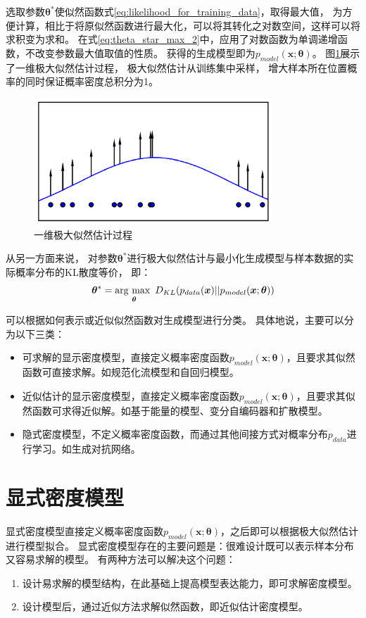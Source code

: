 选取参数{$\bm{\theta}^*$}使似然函数式{\ref{eq:likelihood_for_training_data}}，取得最大值，
为方便计算，相比于将原似然函数进行最大化，可以将其转化之对数空间，这样可以将求积变为求和。
在式{\ref{eq:theta_star_max_2}}中，应用了对数函数为单调递增函数，不改变参数最大值取值的性质。
获得的生成模型即为{$p_{model}(\bm{x};\bm{\theta})$}。
图{\ref{fig:max_likelihood}}展示了一维极大似然估计过程，
极大似然估计从训练集中采样，
增大样本所在位置概率的同时保证概率密度总积分为1。

\begin{figure}[ht]
    \centering
    \includegraphics[width=0.8\textwidth]{figures/max_likelihood}
    \caption{一维极大似然估计过程}\label{fig:max_likelihood}
\end{figure}

从另一方面来说，
对参数{$\bm{\theta}^*$}进行极大似然估计与最小化生成模型与样本数据的实际概率分布的KL散度等价，
即：
\begin{equation}
    \label{eq:kl_divergence_max_theta}
    \bm{\theta}^{*}=\argmax_{\bm{\theta}}{D_{KL}{(p_{data}(\bm{x})||p_{model}(\bm{x};\bm{\theta}))}}
\end{equation}

可以根据如何表示或近似似然函数对生成模型进行分类。
具体地说，主要可以分为以下三类：
\begin{itemize}
    \item 可求解的显示密度模型，直接定义概率密度函数{$p_{model}(\bm{x};\bm{\theta})$}，且要求其似然函数可直接求解。如规范化流模型和自回归模型。
    \item 近似估计的显示密度模型，直接定义概率密度函数{$p_{model}(\bm{x};\bm{\theta})$}，且要求其似然函数可求得近似解。如基于能量的模型、变分自编码器和扩散模型。
    \item 隐式密度模型，不定义概率密度函数，而通过其他间接方式对概率分布{$p_{data}$}进行学习。如生成对抗网络。
\end{itemize}


\section{显式密度模型}\label{section:explicit_density_model}
显式密度模型直接定义概率密度函数{$p_{model}(\bm{x};\bm{\theta})$}，之后即可以根据极大似然估计进行模型拟合。
显式密度模型存在的主要问题是：很难设计既可以表示样本分布又容易求解的模型。
有两种方法可以解决这个问题：
\begin{enumerate}
    \item 设计易求解的模型结构，在此基础上提高模型表达能力，即可求解密度模型。
    \item 设计模型后，通过近似方法求解似然函数，即近似估计密度模型。
\end{enumerate}


